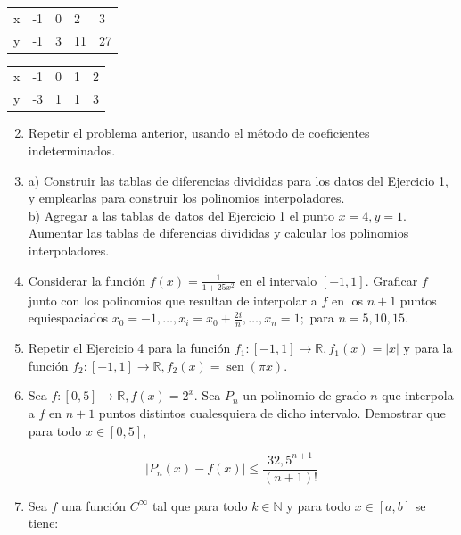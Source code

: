 \documentclass[10pt]{article}
\begin{document}
\begin{center}
\begin{tabular}{l|l|l|l|l|}
\hline
x & -1 & 0 & 2 & 3 \\
y & -1 & 3 & 11 & 27 \\
\hline
\end{tabular}
\end{center}

\begin{center}
\begin{tabular}{|l|l|l|l|l|}
\hline
x & -1 & 0 & 1 & 2 \\
y & -3 & 1 & 1 & 3 \\
\hline
\end{tabular}
\end{center}

\begin{enumerate}
  \setcounter{enumi}{1}
  \item Repetir el problema anterior, usando el método de coeficientes indeterminados.
  \item a) Construir las tablas de diferencias divididas para los datos del Ejercicio 1, y emplearlas para construir los polinomios interpoladores.\\
b) Agregar a las tablas de datos del Ejercicio 1 el punto $x=4, y=1$. Aumentar las tablas de diferencias divididas y calcular los polinomios interpoladores.
  \item Considerar la función $f(x)=\frac{1}{1+25 x^{2}}$ en el intervalo $[-1,1]$. Graficar $f$ junto con los polinomios que resultan de interpolar a $f$ en los $n+1$ puntos equiespaciados $x_{0}= -1, \ldots, x_{i}=x_{0}+\frac{2 i}{n}, \ldots, x_{n}=1 ;$ para $n=5,10,15$.
  \item Repetir el Ejercicio 4 para la función $f_{1}:[-1,1] \rightarrow \mathbb{R}, f_{1}(x)=|x|$ y para la función $f_{2}:[-1,1] \rightarrow \mathbb{R}, f_{2}(x)=\operatorname{sen}(\pi x)$.
  \item Sea $f:[0,5] \rightarrow \mathbb{R}, f(x)=2^{x}$. Sea $P_{n}$ un polinomio de grado $n$ que interpola a $f$ en $n+1$ puntos distintos cualesquiera de dicho intervalo. Demostrar que para todo $x \in[0,5]$,
\end{enumerate}

$$
\left|P_{n}(x)-f(x)\right| \leq \frac{32,5^{n+1}}{(n+1)!}
$$

\begin{enumerate}
  \setcounter{enumi}{6}
  \item Sea $f$ una función $C^{\infty}$ tal que para todo $k \in \mathbb{N}$ y para todo $x \in[a, b]$ se tiene:
\end{enumerate}
\end{document}
